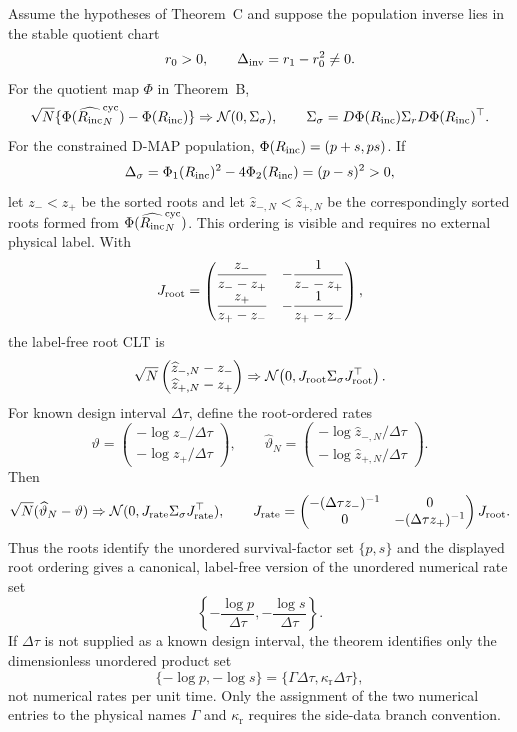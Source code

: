 \begin{paperthm}\label{thm:finite-record-quotient-delta-main}
Assume the hypotheses of Theorem~C and suppose the population inverse lies in
the stable quotient chart
\[
r_0>0,\qquad \Delta_{\rm inv}=r_1-r_0^2\ne0 .
\]
For the quotient map \(\Phi\) in Theorem~B,
\[
\sqrt N\{\Phi(\widehat{R_{\mathrm{inc}}}_N^{\rm cyc})-\Phi(R_{\mathrm{inc}})\}
\Rightarrow
\mathcal N(0,\Sigma_\sigma),
\qquad
\Sigma_\sigma=D\Phi(R_{\mathrm{inc}})\Sigma_rD\Phi(R_{\mathrm{inc}})^\top .
\]
For the constrained D-MAP population, \(\Phi(R_{\mathrm{inc}})=(p+s,ps)\).  If
\[
\Delta_\sigma=\Phi_1(R_{\mathrm{inc}})^2-4\Phi_2(R_{\mathrm{inc}})=(p-s)^2>0,
\]
let \(z_-<z_+\) be the sorted roots and let
\(\widehat z_{-,N}<\widehat z_{+,N}\) be the correspondingly sorted roots
formed from \(\Phi(\widehat{R_{\mathrm{inc}}}_N^{\rm cyc})\).  This ordering is visible and
requires no external physical label.  With
\[
J_{\rm root}=
\begin{pmatrix}
\dfrac{z_-}{z_--z_+}&-\dfrac1{z_--z_+}\\[6pt]
\dfrac{z_+}{z_+-z_-}&-\dfrac1{z_+-z_-}
\end{pmatrix},
\]
the label-free root CLT is
\[
\sqrt N
\begin{pmatrix}\widehat z_{-,N}-z_-\\ \widehat z_{+,N}-z_+\end{pmatrix}
\Rightarrow
\mathcal N\!\left(0,J_{\rm root}\Sigma_\sigma J_{\rm root}^{\top}\right).
\]
For known design interval \(\Delta\tau\), define the root-ordered rates
\[
\vartheta=
\begin{pmatrix}-\log z_-/\Delta\tau\\-\log z_+/\Delta\tau\end{pmatrix},
\qquad
\widehat\vartheta_N=
\begin{pmatrix}-\log\widehat z_{-,N}/\Delta\tau\\
-\log\widehat z_{+,N}/\Delta\tau\end{pmatrix}.
\]
Then
\[
\sqrt N(\widehat\vartheta_N-\vartheta)
\Rightarrow\mathcal N(0,J_{\rm rate}\Sigma_\sigma J_{\rm rate}^{\top}),
\qquad
J_{\rm rate}=
\begin{pmatrix}-(\Delta\tau z_-)^{-1}&0\\
0&-(\Delta\tau z_+)^{-1}\end{pmatrix}J_{\rm root}.
\]
Thus the roots identify the unordered survival-factor set \(\{p,s\}\) and
the displayed root ordering gives a canonical, label-free version of the
unordered numerical rate set
\[
\left\{-\frac{\log p}{\Delta\tau},-\frac{\log s}{\Delta\tau}\right\}.
\]
If \(\Delta\tau\) is not supplied as a known design interval, the theorem
identifies only the dimensionless unordered product set
\[
\{-\log p,-\log s\}
=\{\Gamma\Delta\tau,\kappa_{\mathrm r}\Delta\tau\},
\]
not numerical rates per unit time.
Only the assignment of the two numerical entries to the physical names
\(\Gamma\) and \(\kappa_{\mathrm r}\) requires the side-data branch
convention.
\end{paperthm}

